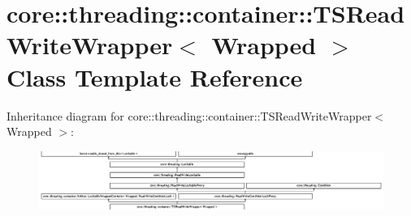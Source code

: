 \hypertarget{classcore_1_1threading_1_1container_1_1_t_s_read_write_wrapper}{\section{core\-:\-:threading\-:\-:container\-:\-:T\-S\-Read\-Write\-Wrapper$<$ Wrapped $>$ Class Template Reference}
\label{classcore_1_1threading_1_1container_1_1_t_s_read_write_wrapper}
}
Inheritance diagram for core\-:\-:threading\-:\-:container\-:\-:T\-S\-Read\-Write\-Wrapper$<$ Wrapped $>$\-:\begin{figure}[H]
\begin{center}
\leavevmode
\includegraphics[height=1.908007cm]{classcore_1_1threading_1_1container_1_1_t_s_read_write_wrapper}
\end{center}
\end{figure}
